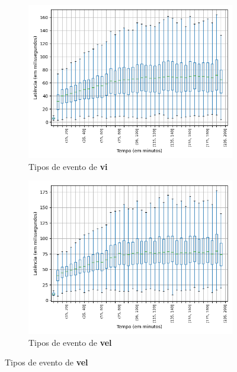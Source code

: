 \begin{figure}
\begin{subfigure}{.5\textwidth}
\centering
\includegraphics[width=\textwidth]{figuras/graphics/boxplot_5-dez-su_vi.png}
\caption{Tipos de evento de \textbf{vi}}
\label{fig:BoxPlot_vi_SU_1}
\end{subfigure}%
\centering
\begin{subfigure}{.5\textwidth}
\centering
\includegraphics[width=\textwidth]{figuras/graphics/boxplot_5-dez-su_vel.png}
\caption{Tipos de evento de \textbf{vel}}
\label{fig:BoxPlot_vel_SU_1}
\end{subfigure}%


\end{figure}
